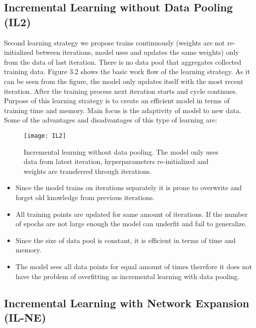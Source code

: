 \subsection{Incremental Learning without Data Pooling (IL2)}

Second learning strategy we propose trains continuously (weights are not re-initialized between iterations, model uses and updates the same weights) only from the data of last iteration. There is no data pool that aggregates collected training data. Figure 3.2 shows the basic work flow of the learning strategy. As it can be seen from the figure, the model only updates itself with the most recent iteration. After the training process next iteration starts and cycle continues. Purpose of this learning strategy is to create an efficient model in terms of training time and memory. Main focus is the adaptivity of model to new data. Some of the advantages and disadvantages of this type of learning are:

\begin{figure}[t]
\texttt{[image: IL2]}
\centering
\caption{Incremental learning without data pooling. The model only uses data from latest iteration, hyperparameters re-initialized and weights are transferred through iterations.}
\end{figure}


\begin{itemize}

\item Since the model trains on iterations separately it is prone to overwrite and forget old knowledge from previous iterations.
\item All training points are updated for same amount of iterations. If the number of epochs are not large enough the model can underfit and fail to generalize.
\item Since the size of data pool is constant, it is efficient in terms of time and memory.
\item The model sees all data points for equal amount of times therefore it does not have the problem of overfitting as incremental learning with data pooling.

\end{itemize}

\subsection{Incremental Learning with Network Expansion (IL-NE)}

